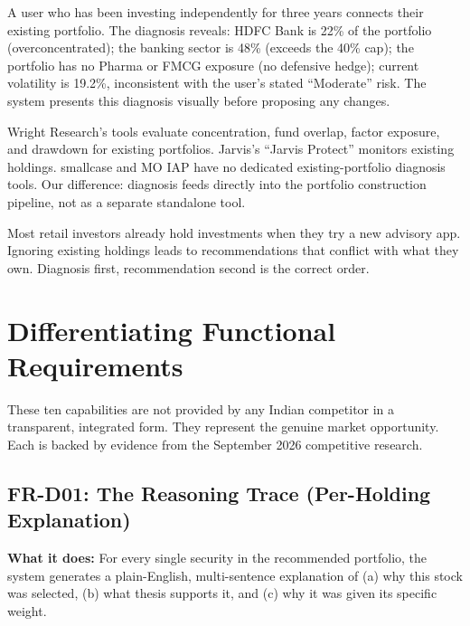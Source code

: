 \documentclass[12pt, a4paper, openany, oneside]{report}
\begin{document}
\begin{examplebox}
A user who has been investing independently for three years connects their existing portfolio. The diagnosis reveals: HDFC Bank is 22\% of the portfolio (overconcentrated); the banking sector is 48\% (exceeds the 40\% cap); the portfolio has no Pharma or FMCG exposure (no defensive hedge); current volatility is 19.2\%, inconsistent with the user's stated ``Moderate'' risk. The system presents this diagnosis visually before proposing any changes.
\end{examplebox}

\begin{gapbox}
Wright Research's tools evaluate concentration, fund overlap, factor exposure, and drawdown for existing portfolios. Jarvis's ``Jarvis Protect'' monitors existing holdings. smallcase and MO IAP have no dedicated existing-portfolio diagnosis tools. Our difference: diagnosis feeds directly into the portfolio construction pipeline, not as a separate standalone tool.
\end{gapbox}

\begin{valuebox}
Most retail investors already hold investments when they try a new advisory app. Ignoring existing holdings leads to recommendations that conflict with what they own. Diagnosis first, recommendation second is the correct order.
\end{valuebox}

\chapter{Differentiating Functional Requirements}

These ten capabilities are not provided by any Indian competitor in a transparent, integrated form. They represent the genuine market opportunity. Each is backed by evidence from the September 2026 competitive research.

\section{FR-D01: The Reasoning Trace (Per-Holding Explanation)}

\textbf{What it does:} For every single security in the recommended portfolio, the system generates a plain-English, multi-sentence explanation of (a) why this stock was selected, (b) what thesis supports it, and (c) why it was given its specific weight.
\end{document}
